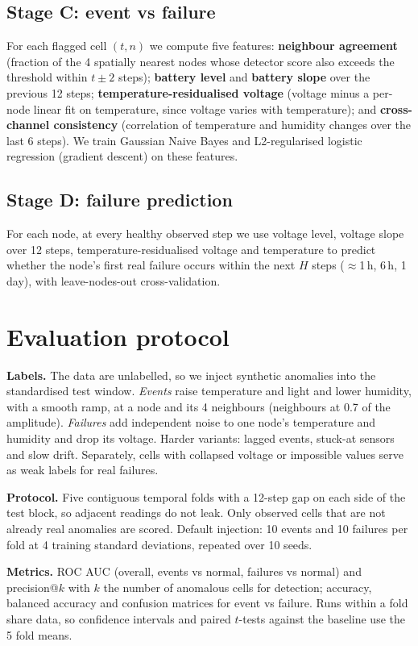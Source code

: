 \documentclass[11pt]{article}
\begin{document}
\subsection{Stage C: event vs failure}
For each flagged cell $(t,n)$ we compute five features: \textbf{neighbour agreement} (fraction of the 4 spatially nearest nodes whose detector score also exceeds the threshold within $t\pm2$ steps); \textbf{battery level} and \textbf{battery slope} over the previous 12 steps; \textbf{temperature-residualised voltage} (voltage minus a per-node linear fit on temperature, since voltage varies with temperature); and \textbf{cross-channel consistency} (correlation of temperature and humidity changes over the last 6 steps). We train Gaussian Naive Bayes and L2-regularised logistic regression (gradient descent) on these features.

\subsection{Stage D: failure prediction}
For each node, at every healthy observed step we use voltage level, voltage slope over 12 steps, temperature-residualised voltage and temperature to predict whether the node's first real failure occurs within the next $H$ steps ($\approx$1\,h, 6\,h, 1 day), with leave-nodes-out cross-validation.

\section{Evaluation protocol}
\textbf{Labels.} The data are unlabelled, so we inject synthetic anomalies into the standardised test window. \emph{Events} raise temperature and light and lower humidity, with a smooth ramp, at a node and its 4 neighbours (neighbours at 0.7 of the amplitude). \emph{Failures} add independent noise to one node's temperature and humidity and drop its voltage. Harder variants: lagged events, stuck-at sensors and slow drift. Separately, cells with collapsed voltage or impossible values serve as weak labels for real failures.

\textbf{Protocol.} Five contiguous temporal folds with a 12-step gap on each side of the test block, so adjacent readings do not leak. Only observed cells that are not already real anomalies are scored. Default injection: 10 events and 10 failures per fold at 4 training standard deviations, repeated over 10 seeds.

\textbf{Metrics.} ROC AUC (overall, events vs normal, failures vs normal) and precision@$k$ with $k$ the number of anomalous cells for detection; accuracy, balanced accuracy and confusion matrices for event vs failure. Runs within a fold share data, so confidence intervals and paired $t$-tests against the baseline use the 5 fold means.
\end{document}
